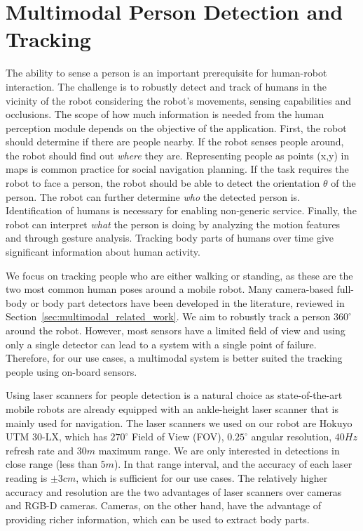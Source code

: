 \chapter{Multimodal Person Detection and Tracking}
\label{chapter:multimodal_person_detection_and_tracking}
The ability to sense a person is an important prerequisite for human-robot interaction. The challenge is to robustly detect and track of humans in the vicinity of the robot considering the robot's movements, sensing capabilities and occlusions. The scope of how much information is needed from the human perception module depends on the objective of the application. First, the robot should determine if there are people nearby. If the robot senses people around, the robot should find out \emph{where} they are. Representing people as points (x,y) in maps is common practice for social navigation planning. If the task requires the robot to face a person, the robot should be able to detect the orientation $\theta$ of the person. The robot can further determine \emph{who} the detected person is. Identification of humans is necessary for enabling non-generic service. Finally, the robot can interpret \emph{what} the person is doing by analyzing the motion features and through gesture analysis. Tracking body parts of humans over time give significant information about human activity.

We focus on tracking people who are either walking or standing, as these are the two most common human poses around a mobile robot. Many camera-based full-body or body part detectors have been developed in the literature, reviewed in Section~\ref{sec:multimodal_related_work}. We aim to robustly track a person $360^{\circ}$ around the robot. However, most sensors have a limited field of view and using only a single detector can lead to a system with a single point of failure. Therefore, for our use cases, a multimodal system is better suited the tracking people using on-board sensors. 

Using laser scanners for people detection is a natural choice as state-of-the-art mobile robots are already equipped with an ankle-height laser scanner that is mainly used for navigation. The laser scanners we used on our robot are Hokuyo UTM 30-LX, which has $270^{\circ}$ Field of View (FOV), $0.25^{\circ}$ angular resolution, $40Hz$ refresh rate and $30m$ maximum range. We are only interested in detections in close range (less than $5m$). In that range interval, and the accuracy of each laser reading is $\pm 3cm$, which is sufficient for our use cases. The relatively higher accuracy and resolution are the two advantages of laser scanners over cameras and RGB-D cameras. Cameras, on the other hand, have the advantage of providing richer information, which can be used to extract body parts. 

